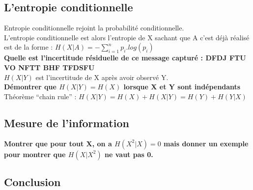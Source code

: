 \subsection{L'entropie conditionnelle}

Entropie conditionnelle rejoint la probabilité conditionnelle.\\
L'entropie conditionnelle est alors l'entropie de X sachant que A c'est déjà réalisé est de la forme : $H(X|A)=-\sum_{i=1}^{n}p_i.log(p_i)$\\
\textbf{Quelle est l'incertitude résiduelle de ce message capturé : DFDJ FTU VO NFTT BHF TFDSFU}\\
$H(X|Y)$ est l'incertitude de X après avoir observé Y.\\
\textbf{Démontrer que $H(X|Y)=H(X)$ lorsque X et Y sont indépendants}\\
Théorème \enquote{chain rule} : $H(X|Y) = H(X) + H(X|Y) = H(Y) + H(Y|X)$

\subsection{Mesure de l'information}

\textbf{Montrer que pour tout X, on a $H(X^2|X)=0$ mais donner un exemple pour montrer que $H(X|X^2)$ ne vaut pas 0.}

\subsection{Conclusion}